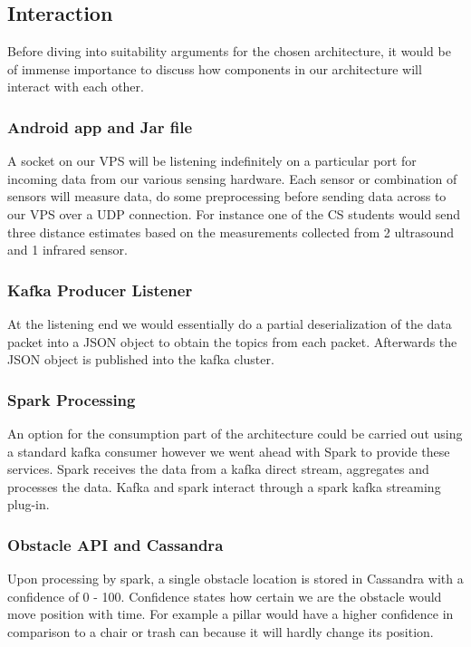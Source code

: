 \documentclass[prodmode,acmtosem]{acmsmall} %
\begin{document}
\subsection{Interaction}

Before diving into suitability arguments for the chosen architecture, it would be of immense importance to discuss how components in our architecture will interact with each other. 

\subsubsection{Android app and Jar file}
A socket on our VPS will be listening indefinitely on a particular port for incoming data from our various sensing hardware. Each sensor or combination of sensors will measure data, do some preprocessing before sending data across to our VPS over a UDP connection. For instance one of the CS students would send three distance estimates based on the measurements collected from 2 ultrasound and 1 infrared sensor.


\subsubsection{Kafka Producer Listener}
At the listening end we would essentially do a partial deserialization of the data packet into a JSON object to obtain the topics from each packet. Afterwards the JSON object is published into the kafka cluster.

\subsubsection{Spark Processing}
An option for the consumption part of the architecture could be carried out using a standard kafka consumer however we went ahead with Spark to provide these services. Spark receives the data from a kafka direct stream, aggregates and processes the data. Kafka and spark interact through a spark kafka streaming plug-in. 

\subsubsection{Obstacle API and Cassandra}
Upon processing by spark, a single obstacle location is stored in Cassandra with a confidence of 0 - 100. Confidence states how certain we are the obstacle would move position with time. For example a pillar would have a higher confidence in comparison to a chair or trash can because it will hardly change its position.
\end{document}
